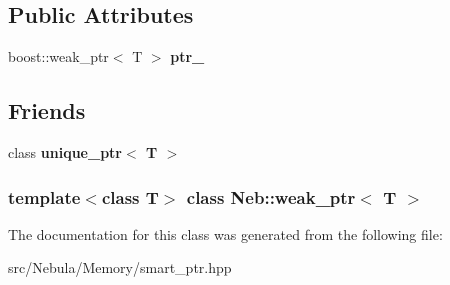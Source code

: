 \subsection*{\-Public \-Attributes}
\begin{DoxyCompactItemize}
\item 
\hypertarget{classNeb_1_1weak__ptr_a9ffc8d0fd4564e9e82d6827570768603}{boost\-::weak\-\_\-ptr$<$ \-T $>$ {\bfseries ptr\-\_\-}}\label{classNeb_1_1weak__ptr_a9ffc8d0fd4564e9e82d6827570768603}

\end{DoxyCompactItemize}
\subsection*{\-Friends}
\begin{DoxyCompactItemize}
\item 
\hypertarget{classNeb_1_1weak__ptr_af421c41ed797729bb606ba7df50551aa}{class {\bfseries unique\-\_\-ptr$<$ T $>$}}\label{classNeb_1_1weak__ptr_af421c41ed797729bb606ba7df50551aa}

\end{DoxyCompactItemize}
\subsubsection*{template$<$class \-T$>$ class Neb\-::weak\-\_\-ptr$<$ T $>$}



\-The documentation for this class was generated from the following file\-:\begin{DoxyCompactItemize}
\item 
src/\-Nebula/\-Memory/smart\-\_\-ptr.\-hpp\end{DoxyCompactItemize}
